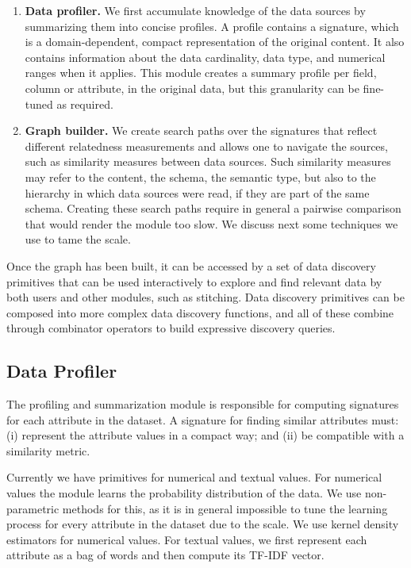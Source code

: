 \begin{enumerate}
\item {\bf Data profiler.} We first accumulate knowledge of the data sources by
summarizing them into concise profiles. A profile contains a signature, which is
a domain-dependent, compact representation of the original content. It also
contains information about the data cardinality, data type, and numerical ranges
when it applies. This module creates a summary profile per field, \ie column or
attribute, in the original data, but this granularity can be fine-tuned as
required.
\item {\bf Graph builder.} We create search paths over the signatures that
reflect different relatedness measurements and allows one to navigate the
sources, such as similarity measures between data sources. Such similarity
measures may refer to the content, the schema, the semantic type, but also to
the hierarchy in which data sources were read, \ie if they are part of the same
schema. Creating these search paths require in general a pairwise comparison
that would render the module too slow.  We discuss next some techniques we use
to tame the scale.  
\end{enumerate}

Once the graph has been built, it can be accessed by a set of data
discovery primitives that can be used interactively to explore and find relevant
data by both users and other modules, such as stitching. Data discovery primitives can be composed
into more complex data discovery functions, and all of these combine through
combinator operators to build expressive discovery queries.  

\subsection{Data Profiler}

The profiling and summarization module is responsible for computing signatures
for each attribute in the dataset. A signature for finding similar attributes
must: (i) represent the attribute values in a compact way; and (ii) be
compatible with a similarity metric. 

Currently we have primitives for numerical and textual values. For numerical
values the module learns the probability distribution of the data. We use
non-parametric methods for this, as it is in general impossible to tune the
learning process for every attribute in the dataset due to the scale. We use
kernel density estimators for numerical values.  For textual values, we first
represent each attribute as a bag of words and then compute its TF-IDF vector.

